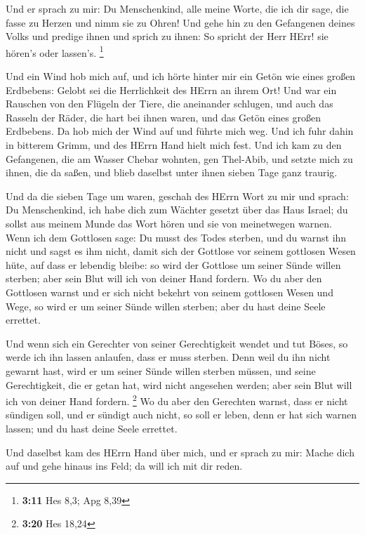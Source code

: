  Und er sprach zu mir: Du Menschenkind, alle meine Worte,
die ich dir sage, die fasse zu Herzen und nimm sie zu Ohren!
 Und gehe hin zu den Gefangenen deines Volks und predige
ihnen und sprich zu ihnen: So spricht der Herr HErr! sie hören's oder
lassen's. \footnote{\textbf{3:11} Hes 8,3; Apg 8,39}

 Und ein Wind hob mich auf, und ich hörte hinter mir ein
Getön wie eines großen Erdbebens: Gelobt sei die Herrlichkeit des HErrn
an ihrem Ort!  Und war ein Rauschen von den Flügeln der
Tiere, die aneinander schlugen, und auch das Rasseln der Räder, die hart
bei ihnen waren, und das Getön eines großen Erdbebens.  Da
hob mich der Wind auf und führte mich weg. Und ich fuhr dahin in
bitterem Grimm, und des HErrn Hand hielt mich fest.  Und
ich kam zu den Gefangenen, die am Wasser Chebar wohnten, gen Thel-Abib,
und setzte mich zu ihnen, die da saßen, und blieb daselbst unter ihnen
sieben Tage ganz traurig.

 Und da die sieben Tage um waren, geschah des HErrn Wort zu
mir und sprach:  Du Menschenkind, ich habe dich zum Wächter
gesetzt über das Haus Israel; du sollst aus meinem Munde das Wort hören
und sie von meinetwegen warnen.  Wenn ich dem Gottlosen
sage: Du musst des Todes sterben, und du warnst ihn nicht und sagst es
ihm nicht, damit sich der Gottlose vor seinem gottlosen Wesen hüte, auf
dass er lebendig bleibe: so wird der Gottlose um seiner Sünde willen
sterben; aber sein Blut will ich von deiner Hand fordern. 
Wo du aber den Gottlosen warnst und er sich nicht bekehrt von seinem
gottlosen Wesen und Wege, so wird er um seiner Sünde willen sterben;
aber du hast deine Seele errettet.

 Und wenn sich ein Gerechter von seiner Gerechtigkeit
wendet und tut Böses, so werde ich ihn lassen anlaufen, dass er muss
sterben. Denn weil du ihn nicht gewarnt hast, wird er um seiner Sünde
willen sterben müssen, und seine Gerechtigkeit, die er getan hat, wird
nicht angesehen werden; aber sein Blut will ich von deiner Hand fordern.
\footnote{\textbf{3:20} Hes 18,24}  Wo du aber den
Gerechten warnst, dass er nicht sündigen soll, und er sündigt auch
nicht, so soll er leben, denn er hat sich warnen lassen; und du hast
deine Seele errettet.

 Und daselbst kam des HErrn Hand über mich, und er sprach
zu mir: Mache dich auf und gehe hinaus ins Feld; da will ich mit dir
reden.

